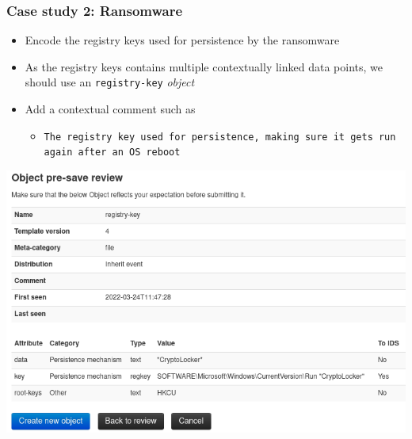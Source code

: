 \begin{frame}
    \frametitle{Case study 2: Ransomware}
    \begin{itemize}
        \item Encode the registry keys used for persistence by the ransomware
        \item As the registry keys contains multiple contextually linked data points, we should use an \texttt{registry-key} \textit{object}
        \item Add a contextual comment such as
        \begin{itemize}
            \item \texttt{The registry key used for persistence, making sure it gets run again after an OS reboot}
        \end{itemize}
    \end{itemize}
    \begin{center}
        \includegraphics[width=0.61\linewidth]{pictures/case2/object-registry-persistence.png}
    \end{center}
\end{frame}

